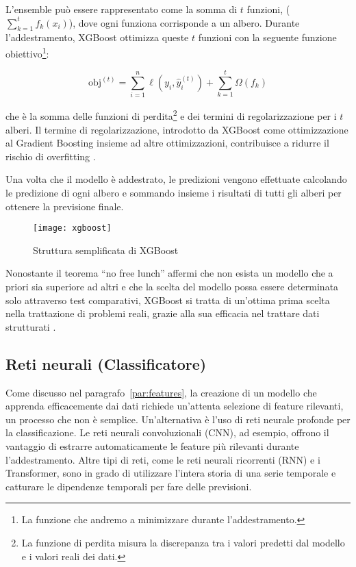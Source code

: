 L'ensemble può essere rappresentato come la somma di $t$ funzioni,
($\sum_{k=1}^{t}f_k(x_i)$), dove ogni funziona corrisponde a un albero.
Durante l'addestramento, XGBoost ottimizza queste $t$ funzioni con la seguente
funzione obiettivo\footnote{La funzione che andremo a minimizzare durante
l'addestramento.}:

$$\text{obj}^{(t)}=\displaystyle\sum_{i=1}^{n}\ell(y_i,\hat{y}_i^{(t)})+\displaystyle\sum_{k=1}^{t}\Omega(f_k)$$

che è la somma delle funzioni di perdita\footnote{La funzione di perdita
misura la discrepanza tra i valori predetti dal modello e i valori reali dei
dati.} e dei termini di regolarizzazione per i $t$ alberi. Il termine di
regolarizzazione, introdotto da XGBoost come ottimizzazione al Gradient
Boosting insieme ad altre ottimizzazioni, contribuisce a ridurre il rischio di
overfitting \cite{chen2016}. 

Una volta che il modello è addestrato, le predizioni vengono effettuate
calcolando le predizione di ogni albero e sommando insieme i risultati di
tutti gli alberi per ottenere la previsione finale.

\begin{figure}[!ht]
    \centering
    \texttt{[image: xgboost]}
    \caption{Struttura semplificata di XGBoost \protect\cite{guo2020}}
    \label{fig:xgboost}
\end{figure}

Nonostante il teorema ``no free lunch'' affermi che non esista un modello che
a priori sia superiore ad altri e che la scelta del modello possa essere
determinata solo attraverso test comparativi, XGBoost si tratta di un'ottima
prima scelta nella trattazione di problemi reali, grazie alla sua efficacia
nel trattare dati strutturati \cite{shwartz2021, chen2016}.

\subsection{Reti neurali (Classificatore)}

Come discusso nel paragrafo~\ref{par:features}, la creazione di un modello che
apprenda efficacemente dai dati richiede un'attenta selezione di feature
rilevanti, un processo che non è semplice. Un'alternativa è l'uso di reti
neurale profonde per la classificazione. Le reti neurali convoluzionali (CNN),
ad esempio, offrono il vantaggio di estrarre automaticamente le feature più
rilevanti durante l'addestramento. Altre tipi di reti, come le reti neurali
ricorrenti (RNN) e i Transformer, sono in grado di utilizzare l'intera storia
di una serie temporale e catturare le dipendenze temporali per fare delle
previsioni.

